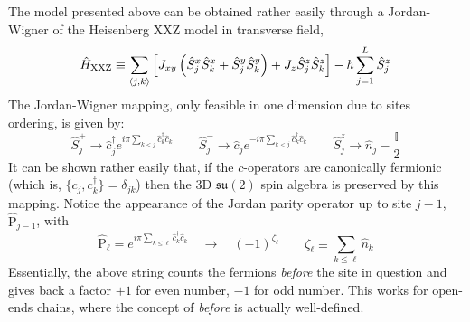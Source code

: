 The model presented above can be obtained rather easily through a Jordan-Wigner of the Heisenberg XXZ model in transverse field,
\begin{equation}\label{eq:xxz-hamiltonian}
	\hat H_\mathrm{XXZ} \equiv \sum_{\ev{j,k}} \left[
		J_{xy} \left( 
			\hat S_j^x \hat S_k^x + \hat S_j^y \hat S_k^y
		\right) + J_z \hat S_j^z \hat S_k^z
	\right] - h \sum_{j=1}^L \hat S_j^z 
\end{equation}
The Jordan-Wigner mapping, only feasible in one dimension due to sites ordering, is given by:
\[
	\hat S_j^+ \to \hat c_j^\dagger e^{i\pi \sum_{k < j} \hat c_k^\dagger \hat c_k}
	\qquad
	\hat S_j^- \to \hat c_j e^{- i\pi \sum_{k < j} \hat c_k^\dagger \hat c_k}
	\qquad
	\hat S_j^z \to \hat n_j - \frac{\mathbb{I}}{2}
\]
It can be shown rather easily that, if the $c$-operators are canonically fermionic (which is, $\lbrace c_j, c_k^\dagger \rbrace = \delta_{jk}$) then the $3$D $\mathfrak{su}(2)$ spin algebra is preserved by this mapping. Notice the appearance of the Jordan parity operator up to site $j-1$, $\hat{\mathrm{P}}_{j-1}$, with
\[
	\hat{\mathrm{P}}_\ell = e^{i\pi \sum_{k \le \ell} \hat c_k^\dagger \hat c_k}
	\quad\to\quad
	(-1)^{\zeta_\ell}
	\qquad
	\zeta_\ell \equiv \sum_{k \le \ell} \hat n_k
\]
Essentially, the above string counts the fermions \textit{before} the site in question and gives back a factor $+1$ for even number, $-1$ for odd number. This works for open-ends chains, where the concept of \textit{before} is actually well-defined. 

